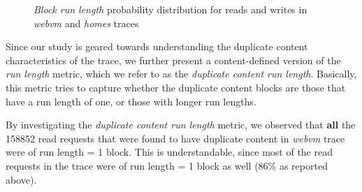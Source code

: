 \begin{figure}[t]
	\hfill
	\caption{\textit{Block run length} probability distribution for reads and writes in \textit{webvm} and \textit{homes} traces}
	\label{fig:runlength-read-write-distrib-prob}
\end{figure}


  
Since our study is geared towards understanding the duplicate content
characteristics of the trace, we further present a content-defined version
of the \textit{run length} metric, which we refer to as the 
\textit{duplicate content run length}. Basically, this metric tries to
capture whether the duplicate content blocks are those that have a run
length of one, or those with longer run lengths.

By investigating the \textit{duplicate content run length} metric, we
observed that \textbf{all} the 158852 read requests that were found to
have duplicate content in \textit{webvm} trace were of run length = 1 block.
This is understandable, since most of the read requests in the trace 
were of run length = 1 block as well (86\% as reported above).




